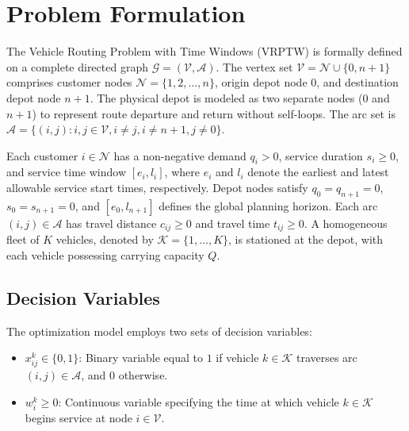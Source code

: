 \section{Problem Formulation}
\label{sec:formulation}

The Vehicle Routing Problem with Time Windows (VRPTW) is formally defined on a complete directed graph $\mathcal{G} = (\mathcal{V}, \mathcal{A})$. The vertex set $\mathcal{V} = \mathcal{N} \cup \{0, n+1\}$ comprises customer nodes $\mathcal{N} = \{1, 2, \dots, n\}$, origin depot node $0$, and destination depot node $n+1$. The physical depot is modeled as two separate nodes ($0$ and $n+1$) to represent route departure and return without self-loops. The arc set is $\mathcal{A} = \{(i, j) : i, j \in \mathcal{V}, i \neq j, i \neq n+1, j \neq 0\}$.

Each customer $i \in \mathcal{N}$ has a non-negative demand $q_i > 0$, service duration $s_i \ge 0$, and service time window $[e_i, l_i]$, where $e_i$ and $l_i$ denote the earliest and latest allowable service start times, respectively. Depot nodes satisfy $q_0 = q_{n+1} = 0$, $s_0 = s_{n+1} = 0$, and $[e_0, l_{n+1}]$ defines the global planning horizon. Each arc $(i, j) \in \mathcal{A}$ has travel distance $c_{ij} \ge 0$ and travel time $t_{ij} \ge 0$. A homogeneous fleet of $K$ vehicles, denoted by $\mathcal{K} = \{1, \dots, K\}$, is stationed at the depot, with each vehicle possessing carrying capacity $Q$.

\subsection{Decision Variables}
The optimization model employs two sets of decision variables:
\begin{itemize}
    \item $x_{ij}^k \in \{0, 1\}$: Binary variable equal to $1$ if vehicle $k \in \mathcal{K}$ traverses arc $(i, j) \in \mathcal{A}$, and $0$ otherwise.
    \item $w_i^k \ge 0$: Continuous variable specifying the time at which vehicle $k \in \mathcal{K}$ begins service at node $i \in \mathcal{V}$.
\end{itemize}


